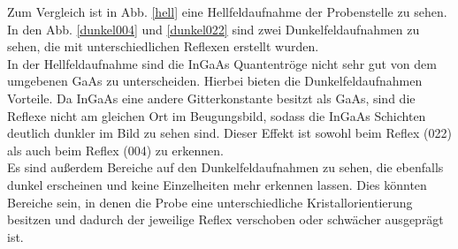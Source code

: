 \documentclass[a4paper,11pt,DIV=11]{scrartcl}
\begin{document}
Zum Vergleich ist in Abb. \ref{hell} eine Hellfeldaufnahme der Probenstelle zu sehen. In den Abb. \ref{dunkel004} und \ref{dunkel022} sind zwei Dunkelfeldaufnahmen zu sehen, die mit unterschiedlichen Reflexen erstellt wurden. \\
In der Hellfeldaufnahme sind die InGaAs Quantentröge nicht sehr gut von dem umgebenen GaAs zu unterscheiden. Hierbei bieten die Dunkelfeldaufnahmen Vorteile. Da InGaAs eine andere Gitterkonstante besitzt als GaAs, sind die Reflexe nicht am gleichen Ort im Beugungsbild, sodass die InGaAs Schichten deutlich dunkler im Bild zu sehen sind. Dieser Effekt ist sowohl beim Reflex (022) als auch beim Reflex (004) zu erkennen. \\
Es sind außerdem Bereiche auf den Dunkelfeldaufnahmen zu sehen, die ebenfalls dunkel erscheinen und keine Einzelheiten mehr erkennen lassen. Dies könnten Bereiche sein, in denen die Probe eine unterschiedliche Kristallorientierung besitzen und dadurch der jeweilige Reflex verschoben oder schwächer ausgeprägt ist. \\
\end{document}
